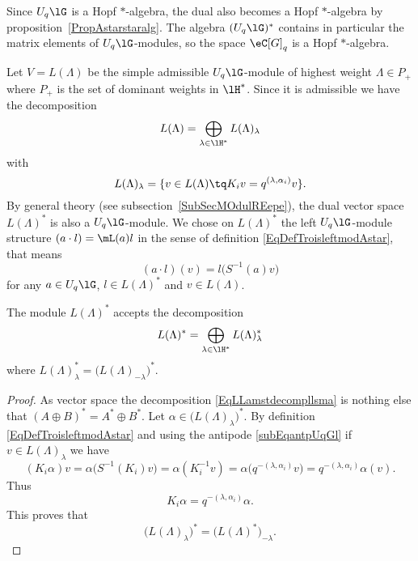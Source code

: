 Since \( U_q\lG\) is a Hopf \( *\)-algebra, the dual also becomes a Hopf \( *\)-algebra by proposition~\ref{PropAstarstaralg}. The algebra \( (U_q\lG)^*\) contains in particular the matrix elements of \( U_q\lG\)-modules, so the space \( \eC[G]_q\) is a Hopf \( *\)-algebra.

Let \( V=L(\Lambda)\) be the simple admissible \( U_q\lG\)-module of highest weight \( \Lambda\in P_+\) where \( P_+\) is the set of dominant weights in \( \lH^*\). Since it is admissible we have the decomposition
\begin{equation}
	L(\Lambda)=\bigoplus_{\lambda\in\lH^*}L(\Lambda)_{\lambda}
\end{equation}
with
\begin{equation}
	L(\Lambda)_{\lambda}=\{ v\in L(\Lambda)\tq K_iv=q^{(\lambda,\alpha_i)}v \}.
\end{equation}
By general theory (see subsection~\ref{SubSecMOdulREepe}), the dual vector space \( L(\Lambda)^*\) is also a \( U_q\lG\)-module. We chose on \( L(\Lambda)^*\) the left \( U_q\lG\)-module structure \( (a\cdot l)=\mL(a)l\) in the sense of definition \eqref{EqDefTroisleftmodAstar}, that means
\begin{equation}
	(a\cdot l)(v)=l\big( S^{-1}(a)v \big)
\end{equation}
for any \( a\in U_q\lG\), \( l\in L(\Lambda)^*\) and \( v\in L(\Lambda)\).

\begin{lemma}
	The module \( L(\Lambda)^*\) accepts the decomposition
	\begin{equation}        \label{EqLLamstdecompllsma}
		L(\Lambda)^*=\bigoplus_{\lambda\in\lH^*}L(\Lambda)_{\lambda}^*
	\end{equation}
	where \( L(\Lambda)_{\lambda}^*=\big( L(\Lambda)_{-\lambda} \big)^*\).
\end{lemma}

\begin{proof}
	As vector space the decomposition \eqref{EqLLamstdecompllsma} is nothing else that \( (A\oplus B)^*=A^*\oplus B^*\). Let \( \alpha\in\big( L(\Lambda)_{\lambda} \big)^*\). By definition \eqref{EqDefTroisleftmodAstar} and using the antipode \eqref{subEqantpUqGl} if \( v\in L(\Lambda)_{\lambda}\) we have
	\begin{equation}
		(K_i\alpha)v=\alpha\big( S^{-1}(K_i)v \big)=\alpha(K_i^{-1}v) =\alpha\big( q^{-(\lambda,\alpha_i)}v \big) =q^{-(\lambda,\alpha_i)}\alpha(v).
	\end{equation}
	Thus
	\begin{equation}
		K_i\alpha=q^{-(\lambda,\alpha_i)}\alpha.
	\end{equation}
	This proves that
	\begin{equation}
		\big( L(\Lambda)_{\lambda} \big)^*=\big( L(\Lambda)^* \big)_{-\lambda}.
	\end{equation}
\end{proof}

